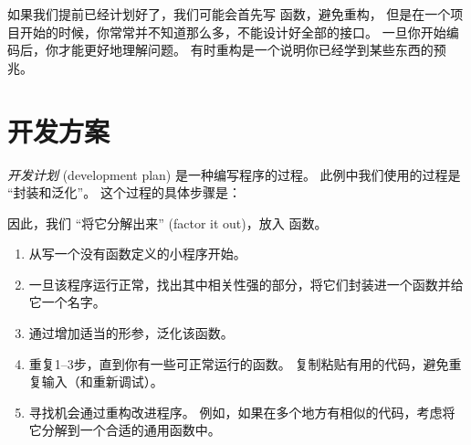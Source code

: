 如果我们提前已经计划好了，我们可能会首先写  函数，避免重构，
但是在一个项目开始的时候，你常常并不知道那么多，不能设计好全部的接口。
一旦你开始编码后，你才能更好地理解问题。
有时重构是一个说明你已经学到某些东西的预兆。


\section{开发方案}



\emph{开发计划} (development plan) 是一种编写程序的过程。
此例中我们使用的过程是 ``封装和泛化''。 这个过程的具体步骤是：

因此，我们 ``将它分解出来'' (factor it out)，放入  函数。


\begin{enumerate}

\item 从写一个没有函数定义的小程序开始。

\item 一旦该程序运行正常，找出其中相关性强的部分，将它们封装进一个函数并给它一个名字。

\item 通过增加适当的形参，泛化该函数。

\item 重复1–3步，直到你有一些可正常运行的函数。
   复制粘贴有用的代码，避免重复输入（和重新调试）。

\item 寻找机会通过重构改进程序。
   例如，如果在多个地方有相似的代码，考虑将它分解到一个合适的通用函数中。

\end{enumerate}

